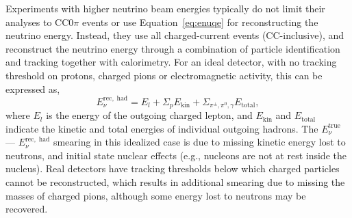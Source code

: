 \documentclass{ar-1col}
\begin{document}
Experiments with higher neutrino beam energies typically do not limit their analyses to CC0$\pi$ events or use Equation~\ref{eq:enuqe} for reconstructing the neutrino energy. Instead, they use all charged-current events (CC-inclusive), and reconstruct the neutrino energy through a combination of particle identification and tracking together with calorimetry.
For an ideal detector, with no tracking threshold on protons, charged pions or electromagnetic activity, this can be expressed as,
\begin{equation}
E_{\nu}^{\mathrm{rec,\;had}} = E_{l} + \Sigma_{p} E_{\mathrm{kin}} + \Sigma_{\pi^{\pm}, \pi^{0}, \gamma} E_{\mathrm{total}},
\label{eq:enuhad}
\end{equation}
\noindent where $E_{l}$ is the energy of the outgoing charged lepton, and $E_{\mathrm{kin}}$ and $E_{\mathrm{total}}$ indicate the kinetic and total energies of individual outgoing hadrons.
The $E_{\nu}^{\mathrm{true}}$ --- $E_{\nu}^{\mathrm{rec,\;had}}$ smearing in this idealized case is due to missing kinetic energy lost to neutrons, and initial state nuclear effects (e.g., nucleons are not at rest inside the nucleus). Real detectors have tracking thresholds below which charged particles cannot be reconstructed, which results in additional smearing due to missing the masses of charged pions, although some energy lost to neutrons may be recovered.
\end{document}

